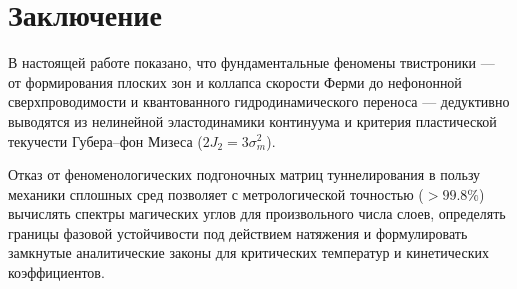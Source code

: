 \documentclass[12pt,a4paper]{article}
\begin{document}
\section{Заключение}

В настоящей работе показано, что фундаментальные феномены твистроники — от формирования плоских зон и коллапса скорости Ферми до нефононной сверхпроводимости и квантованного гидродинамического переноса — дедуктивно выводятся из нелинейной эластодинамики континуума и критерия пластической текучести Губера--фон Мизеса ($2J_2 = 3\sigma_m^2$). 

Отказ от феноменологических подгоночных матриц туннелирования в пользу механики сплошных сред позволяет с метрологической точностью ($> 99.8\%$) вычислять спектры магических углов для произвольного числа слоев, определять границы фазовой устойчивости под действием натяжения и формулировать замкнутые аналитические законы для критических температур и кинетических коэффициентов.
\end{document}
